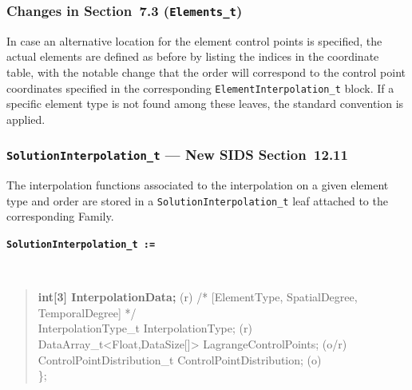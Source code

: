 \documentclass[11pt,letterpaper]{article}
\newenvironment{v2quote}
  {\begin{v2quoteframe}%
   \noindent{\footnotesize\sffamily\bfseries\color{cgnsblue}v2 text}%
   \nopagebreak\par\nopagebreak\vspace{0.15em}}
  {\end{v2quoteframe}}
\newenvironment{sidsnode}[1]{%
  \par\vspace{0.8em}%
  \noindent\colorbox{cgnslight!50}{\parbox{\dimexpr\linewidth-2\fboxsep}{%
    \raggedright\texttt{\textbf{\color{cgnsblue}#1}}}}\\[0.3em]%
  \begin{quote}\ttfamily
}{%
  \end{quote}\vspace{0.4em}%
}
\begin{document}
\subsubsection{Changes in Section~7.3 (\texttt{Elements\_t})}

\begin{v2quote}
In case an alternative location for the element control points is specified, the actual elements
are defined as before by listing the indices in the coordinate table, with the notable change that
the order will correspond to the control point coordinates specified in the corresponding
\texttt{ElementInterpolation\_t} block.  If a specific element type is not found among these
leaves, the standard convention is applied.
\end{v2quote}

\subsubsection{\texttt{SolutionInterpolation\_t} --- New SIDS Section~12.11}
\label{sec:solution-interpolation}

\begin{v2quote}
The interpolation functions associated to the interpolation on a given element type and order
are stored in a \texttt{SolutionInterpolation\_t} leaf attached to the corresponding Family.
\end{v2quote}

\begin{sidsnode}{SolutionInterpolation\_t :=}
\textbf{int[3] InterpolationData;}                       \textrm{(r)} \quad\textrm{/* [ElementType, SpatialDegree, TemporalDegree] */}\\
InterpolationType\_t InterpolationType;                  \textrm{(r)}\\
DataArray\_t<Float,DataSize[]> LagrangeControlPoints;    \textrm{(o/r)}\\
ControlPointDistribution\_t ControlPointDistribution; \textrm{(o)}\\
\};
\end{sidsnode}
\end{document}
